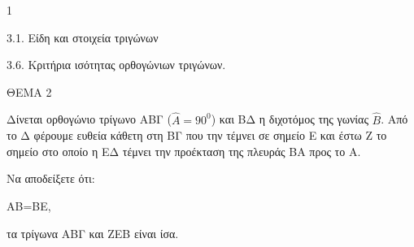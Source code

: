 \begin{ylh}{1}
    \item 3.1. Είδη και στοιχεία τριγώνων
    \item 3.6. Κριτήρια ισότητας ορθογώνιων τριγώνων.
\end{ylh}

ΘΕΜΑ 2

Δίνεται ορθογώνιο τρίγωνο ΑΒΓ ($\widehat{Α} = 90^{0}$) και ΒΔ η διχοτόμος της γωνίας $\widehat{Β}$. Από το Δ φέρουμε ευθεία κάθετη στη ΒΓ που την τέμνει σε σημείο Ε και έστω Ζ το σημείο στο οποίο η ΕΔ τέμνει την προέκταση της πλευράς ΒΑ προς το A.

Να αποδείξετε ότι:

\begin{alist}
\item ΑΒ=ΒΕ, 

\item τα τρίγωνα ΑΒΓ και ΖΕΒ είναι ίσα. 
\end{alist}
